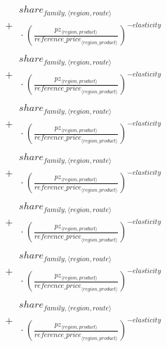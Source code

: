 \documentclass[11pt]{article}
\begin{document}
\begin{align*}
{\begin{aligned}
\begin{aligned}
\end{aligned}\\
{}+ \begin{aligned}
share_{family,\langle region, route\rangle}\\
{}\cdot {\left(\frac{pz_{\langle region, product\rangle}}{{reference\_price}_{\langle region, product\rangle}}\right)}^{-elasticity}
\end{aligned}\\
{}+ \begin{aligned}
share_{family,\langle region, route\rangle}\\
{}\cdot {\left(\frac{pz_{\langle region, product\rangle}}{{reference\_price}_{\langle region, product\rangle}}\right)}^{-elasticity}
\end{aligned}\\
{}+ \begin{aligned}
share_{family,\langle region, route\rangle}\\
{}\cdot {\left(\frac{pz_{\langle region, product\rangle}}{{reference\_price}_{\langle region, product\rangle}}\right)}^{-elasticity}
\end{aligned}\\
{}+ \begin{aligned}
share_{family,\langle region, route\rangle}\\
{}\cdot {\left(\frac{pz_{\langle region, product\rangle}}{{reference\_price}_{\langle region, product\rangle}}\right)}^{-elasticity}
\end{aligned}\\
{}+ \begin{aligned}
share_{family,\langle region, route\rangle}\\
{}\cdot {\left(\frac{pz_{\langle region, product\rangle}}{{reference\_price}_{\langle region, product\rangle}}\right)}^{-elasticity}
\end{aligned}\\
{}+ \begin{aligned}
share_{family,\langle region, route\rangle}\\
{}\cdot {\left(\frac{pz_{\langle region, product\rangle}}{{reference\_price}_{\langle region, product\rangle}}\right)}^{-elasticity}
\end{aligned}\\
{}+ \begin{aligned}
share_{family,\langle region, route\rangle}\\
{}\cdot {\left(\frac{pz_{\langle region, product\rangle}}{{reference\_price}_{\langle region, product\rangle}}\right)}^{-elasticity}

\end{aligned}
\end{aligned}}
\end{align*}
\end{document}
